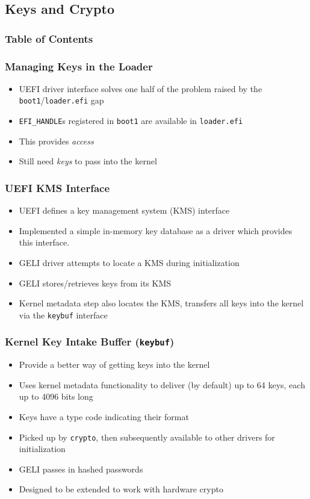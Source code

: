\documentclass{beamer}
\begin{document}
\subsection{Keys and Crypto}

\begin{frame}
  \frametitle{Table of Contents}
  \tableofcontents[currentsection]
\end{frame}


\begin{frame}
  \frametitle{Managing Keys in the Loader}
  \begin{itemize}
  \item UEFI driver interface solves one half of the problem raised by
    the \texttt{boot1}/\texttt{loader.efi} gap
  \item \texttt{EFI\_HANDLE}s registered in \texttt{boot1} are available
    in \texttt{loader.efi}
  \item This provides \emph{access}
  \item Still need \emph{keys} to pass into the kernel
  \end{itemize}
\end{frame}

\begin{frame}
  \frametitle{UEFI KMS Interface}
  \begin{itemize}
  \item UEFI defines a key management system (KMS) interface
  \item Implemented a simple in-memory key database as a driver which
    provides this interface.
  \item GELI driver attempts to locate a KMS during initialization
  \item GELI stores/retrieves keys from its KMS
  \item Kernel metadata step also locates the KMS, transfers all keys
    into the kernel via the \texttt{keybuf} interface
  \end{itemize}
\end{frame}

\begin{frame}
  \frametitle{Kernel Key Intake Buffer (\texttt{keybuf})}
  \begin{itemize}
  \item Provide a better way of getting keys into the kernel
  \item Uses kernel metadata functionality to deliver (by default) up
    to 64 keys, each up to 4096 bits long
  \item Keys have a type code indicating their format
  \item Picked up by \texttt{crypto}, then subsequently available to
    other drivers for initialization
  \item GELI passes in hashed passwords
  \item Designed to be extended to work with hardware crypto
  \end{itemize}
\end{frame}
\end{document}
